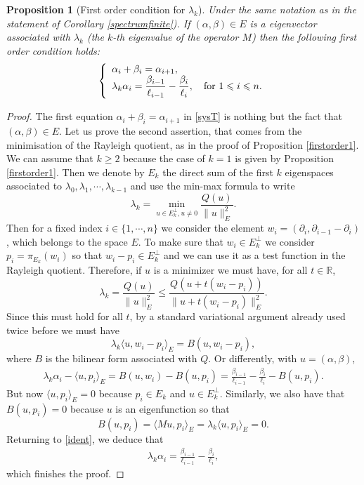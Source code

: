 \documentclass[12pt,english]{smfart} %
\newtheorem{proposition}[theorem]{Proposition}
\theoremstyle{remark}
\newcommand{\R}{\mathbb{R}}
\begin{document}
 
   \medskip\begin{proposition}[First order condition for $\lambda_k$] \label{firstorder2} Under the same notation as in the statement of Corollary \ref{spectrumfinite}). If $(\alpha,\beta)\in E$ is a eigenvector associated with $\lambda_k$ (the $k$-th eigenvalue of the operator $M$)  then the following first order condition holds:
    \begin{eqnarray} 
\left\{
 \begin{array}{ll}
\alpha_i+\beta_i=\alpha_{i+1},\\ \displaystyle
\lambda_k\alpha_i=\frac{\beta_{i-1}}{\ell_{i-1}} - \frac{\beta_i}{\ell_i}, \quad \textnormal{for } 1\leqslant i  \leqslant n.
 \end{array}
  \right. 
  \label{sysT}
 \end{eqnarray}
   \end{proposition}
 
 \begin{proof} The first equation $\alpha_i+\beta_i=\alpha_{i+1}$ in \eqref{sysT} is nothing but the fact that $(\alpha,\beta)\in E$. Let us prove the second assertion, that comes from the minimisation of the Rayleigh quotient, as in the proof of Proposition \ref{firstorder1}. We can assume that $k\geqslant 2$ because the case of $k=1$ is given by  Proposition \ref{firstorder1}. Then we denote by $E_k$ the direct sum of the first $k$ eigenspaces associated to $\lambda_0,\lambda_1,\cdots,\lambda_{k-1}$  and use the min-max formula to write
 $$\lambda_k= \min_{u \in E_k^\bot, u\not = 0} \frac{Q(u)}{\|u\|_E^2}.$$
 Then for a fixed index $i\in\{1,\cdots,n\}$ we consider the element $w_i=(\partial_i, \partial_{i-1}-\partial_i)$, which belongs to the space $E$. To make sure that $w_i\in E_k^\bot$ we consider $p_i=\pi_{E_k}(w_i)$ so that   $w_i-p_i \in E_{k}^\bot$ and we can use it as a test function in the Rayleigh quotient. Therefore, if $u$ is a minimizer we must have, for all $t\in \R$, 
 $$\lambda_k =\frac{Q(u)}{\|u\|_E^2} \leqslant  \frac{Q(u+t (w_i-p_i))}{\|u+t (w_i-p_i)\|_E^2}.$$
 Since this must hold for all $t$, by a standard variational argument already used twice before we must have 
 $$\lambda_k \langle u, w_i-p_i \rangle_E = B(u,w_i-p_i),$$
 where $B$ is the bilinear form associated with $Q$. Or differently, with $u=(\alpha, \beta)$,
 \begin{eqnarray}
 \lambda_k \alpha_i -  \langle  u,p_i \rangle_E = B(u,w_i)-B(u,p_i)=\frac{\beta_{i-1}}{\ell_{i-1}} - \frac{\beta_i}{\ell_i}-B(u,p_i).\label{ident}
\end{eqnarray} 
  But now $\langle  u,p_i \rangle_E=0$ because  $p_i\in E_k$ and  $u \in E_k^\bot$. Similarly, we also have that  $B(u,p_i)=0$ because $u$ is an eigenfunction so that 
  $$B(u,p_i)= \langle  Mu,p_i \rangle_E=\lambda_k\langle  u,p_i \rangle_E=0.$$
  Returning to \eqref{ident}, we deduce that 
   \begin{eqnarray}
 \lambda_k \alpha_i =\frac{\beta_{i-1}}{\ell_{i-1}} - \frac{\beta_i}{\ell_i},
\end{eqnarray} 
which finishes the proof.
  \end{proof}
\end{document}
